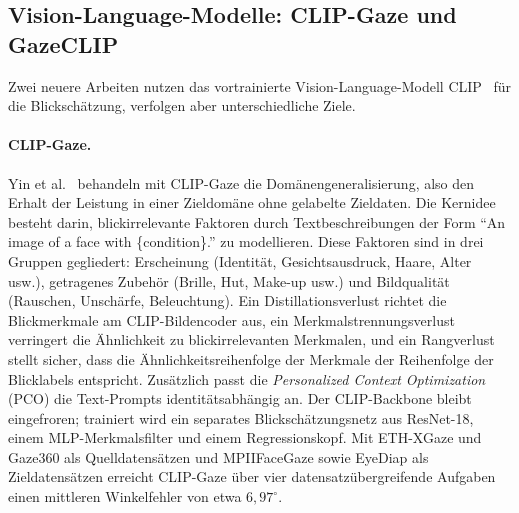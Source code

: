 \documentclass[
  11pt,
  a4paper,
  oneside,
  DIV=12,                 %
  BCOR=8mm,               %
  parskip=half,           %
  headings=normal,
  bibliography=totoc,     %
  listof=totoc            %
]{scrreprt}
\begin{document}
\subsection{Vision-Language-Modelle: CLIP-Gaze und GazeCLIP}
\label{subsec:clip}
Zwei neuere Arbeiten nutzen das vortrainierte Vision-Language-Modell CLIP~\cite{radford2021clip} für die Blickschätzung, verfolgen aber unterschiedliche Ziele.

\paragraph{CLIP-Gaze.}
Yin et al.~\cite{yin2024clipgaze} behandeln mit CLIP-Gaze die Domänengeneralisierung, also den Erhalt der Leistung in einer Zieldomäne ohne gelabelte Zieldaten. Die Kernidee besteht darin, blickirrelevante Faktoren durch Textbeschreibungen der Form \enquote{An image of a face with \{condition\}.} zu modellieren. Diese Faktoren sind in drei Gruppen gegliedert: Erscheinung (Identität, Gesichtsausdruck, Haare, Alter usw.), getragenes Zubehör (Brille, Hut, Make-up usw.) und Bildqualität (Rauschen, Unschärfe, Beleuchtung). Ein Distillationsverlust richtet die Blickmerkmale am CLIP-Bildencoder aus, ein Merkmalstrennungsverlust verringert die Ähnlichkeit zu blickirrelevanten Merkmalen, und ein Rangverlust stellt sicher, dass die Ähnlichkeitsreihenfolge der Merkmale der Reihenfolge der Blicklabels entspricht. Zusätzlich passt die \emph{Personalized Context Optimization} (PCO) die Text-Prompts identitätsabhängig an. Der CLIP-Backbone bleibt eingefroren; trainiert wird ein separates Blickschätzungsnetz aus ResNet-18, einem MLP-Merkmalsfilter und einem Regressionskopf. Mit ETH-XGaze und Gaze360 als Quelldatensätzen und MPIIFaceGaze sowie EyeDiap als Zieldatensätzen erreicht CLIP-Gaze über vier datensatzübergreifende Aufgaben einen mittleren Winkelfehler von etwa $6,97^\circ$.
\end{document}
